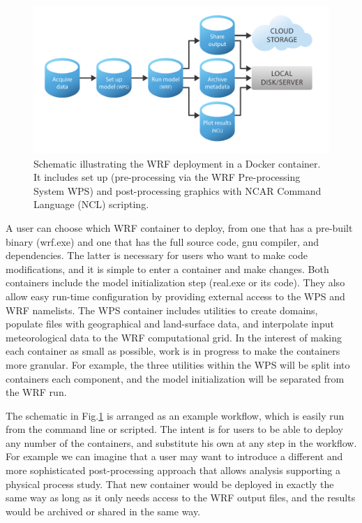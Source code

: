 \documentclass[final]{ametsoc}
\begin{document}
\begin{figure}
\begin{center}
\includegraphics[clip,viewport=20 0 700 360,scale=0.65]{figures/Fig01.pdf}
\caption{\label{Fig:Containers} Schematic illustrating the WRF deployment in a Docker container. It includes set up (pre-processing via the WRF Pre-processing System WPS) and post-processing graphics with NCAR Command Language (NCL) scripting.}
\end{center}
\end{figure}

A user can choose which WRF container to deploy, from one that has a pre-built binary (wrf.exe) and one that has the full source code, gnu compiler, and dependencies. The latter is necessary for users who want to make code modifications, and it is simple to enter a container and make changes. Both containers include the model initialization step (real.exe or its code). They also allow easy run-time configuration by providing external access to the WPS and WRF namelists. The WPS container includes utilities to create domains, populate files with geographical and land-surface data, and interpolate input meteorological data to the WRF computational grid. In the interest of making each container as small as possible, work is in progress to make the containers more granular. For example, the three utilities within the WPS will be split into containers each component, and the model initialization will be separated from the WRF run. 

The schematic in Fig.\@ \ref{Fig:Containers} is arranged as an example workflow, which is easily run from the command line or scripted. The intent is for users to be able to deploy any number of the containers, and substitute his own at any step in the workflow. For example we can imagine that a user may want to introduce a different and more sophisticated post-processing approach that allows analysis supporting a physical  process study. That new container would be deployed in exactly the same way as long as it only needs access to the WRF output files, and the results would be archived or shared in the same way. 
\end{document}
